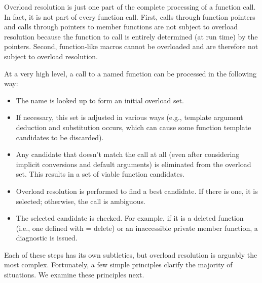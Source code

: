 Overload resolution is just one part of the complete processing of a function call. In fact, it is not part of every function call. First, calls through function pointers and calls through pointers to member functions are not subject to overload resolution because the function to call is entirely determined (at run time) by the pointers. Second, function-like macros cannot be overloaded and are therefore not subject to overload resolution.

At a very high level, a call to a named function can be processed in the following way:

\begin{itemize}
\item 
The name is looked up to form an initial overload set.

\item 
If necessary, this set is adjusted in various ways (e.g., template argument deduction and substitution occurs, which can cause some function template candidates to be discarded).

\item 
Any candidate that doesn’t match the call at all (even after considering implicit conversions and default arguments) is eliminated from the overload set. This results in a set of viable function candidates.

\item 
Overload resolution is performed to find a best candidate. If there is one, it is selected; otherwise, the call is ambiguous.

\item 
The selected candidate is checked. For example, if it is a deleted function (i.e., one defined with = delete) or an inaccessible private member function, a diagnostic is issued.
\end{itemize}

Each of these steps has its own subtleties, but overload resolution is arguably the most complex. Fortunately, a few simple principles clarify the majority of situations. We examine these principles next.














































